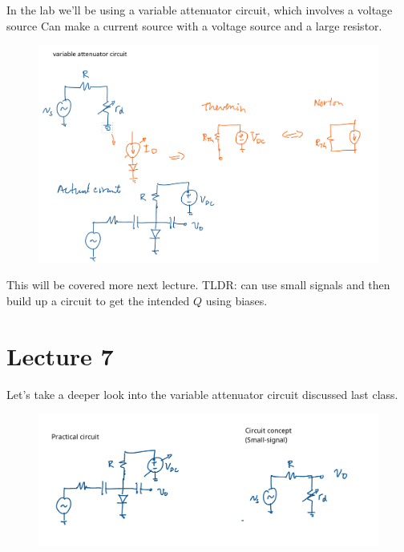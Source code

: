 \documentclass[../notes.tex]{subfiles}
\begin{document}
In the lab we'll be using a variable attenuator circuit, which involves a voltage source
Can make a current source with a voltage source and a large resistor.

\begin{figure}[H]
	\centering
	\includegraphics[width=0.8\linewidth]{img/image_2022-09-20-14-02-07.png}
\end{figure}

This will be covered more next lecture. TLDR: can use small signals and then build up a circuit to get the intended $ Q $ using biases.










\section{Lecture 7}

Let's take a deeper look into the variable attenuator circuit discussed last class.


\begin{figure}[H]
	\centering
	\includegraphics[width=0.8\linewidth]{img/image_2022-09-23-12-20-50.png}
\end{figure}
\end{document}
